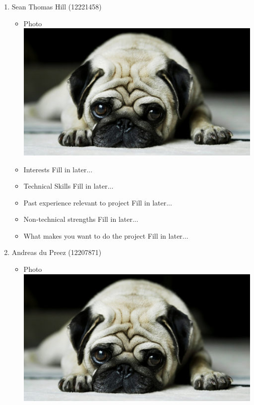 \documentclass[12pt, oneside]{article}
\begin{document}
\begin{enumerate}
		\item {Sean Thomas Hill (12221458)\par}
		\begin{itemize}
			\item Photo\newline
				\includegraphics[scale=0.1]{example} %
			\item Interests\newline
				Fill in later...
			\item Technical Skills\newline
				Fill in later...
			\item Past experience relevant to project\newline
				Fill in later...
			\item Non-technical strengths\newline
				Fill in later...
			\item What makes you want to do the project\newline
				Fill in later...
		\end{itemize}
		\item {Andreas du Preez (12207871)\par}
		\begin{itemize}
			\item Photo\newline
				\includegraphics[scale=0.1]{example} %

\end{itemize}
\end{enumerate}
\end{document}
